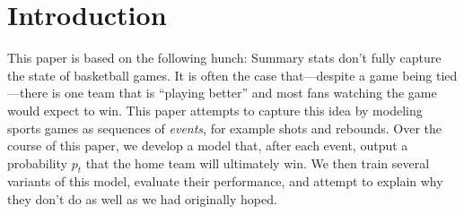 \section{Introduction}

This paper is based on the following hunch: Summary stats don't fully capture the state of basketball games. It is often the case that---despite a game being tied---there is one team that is ``playing better'' and most fans watching the game would expect to win. This paper attempts to capture this idea by modeling sports games as sequences of \emph{events}, for example shots and rebounds. Over the course of this paper, we develop a model that, after each event, output a probability $p_t$ that the home team will ultimately win. We then train several variants of this model, evaluate their performance, and attempt to explain why they don't do as well as we had originally hoped.


